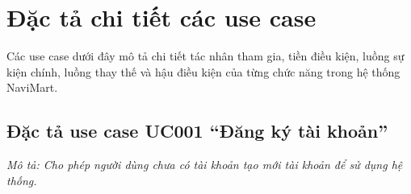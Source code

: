 \documentclass[../main.tex]{subfiles}
\begin{document}
\section{Đặc tả chi tiết các use case}
Các use case dưới đây mô tả chi tiết tác nhân tham gia, tiền điều kiện, luồng sự kiện chính, luồng thay thế và hậu điều kiện của từng chức năng trong hệ thống NaviMart.

\subsection{Đặc tả use case UC001 ``Đăng ký tài khoản''}
\textit{Mô tả: Cho phép người dùng chưa có tài khoản tạo mới tài khoản để sử dụng hệ thống.}
\vspace{0.5cm}

\begingroup
\renewcommand{\arraystretch}{1.5}
\end{document}
